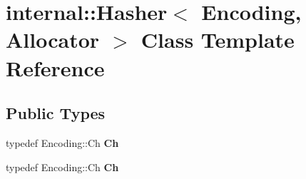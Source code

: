 \hypertarget{classinternal_1_1_hasher}{}\section{internal\+:\+:Hasher$<$ Encoding, Allocator $>$ Class Template Reference}
\label{classinternal_1_1_hasher}
\subsection*{Public Types}
\begin{DoxyCompactItemize}
\item 
typedef Encoding\+::\+Ch {\bfseries Ch}\hypertarget{classinternal_1_1_hasher_a415970af68a067615c3c95306cff6d43}{}\label{classinternal_1_1_hasher_a415970af68a067615c3c95306cff6d43}

\item 
typedef Encoding\+::\+Ch {\bfseries Ch}\hypertarget{classinternal_1_1_hasher_a415970af68a067615c3c95306cff6d43}{}\label{classinternal_1_1_hasher_a415970af68a067615c3c95306cff6d43}

\end{DoxyCompactItemize}
